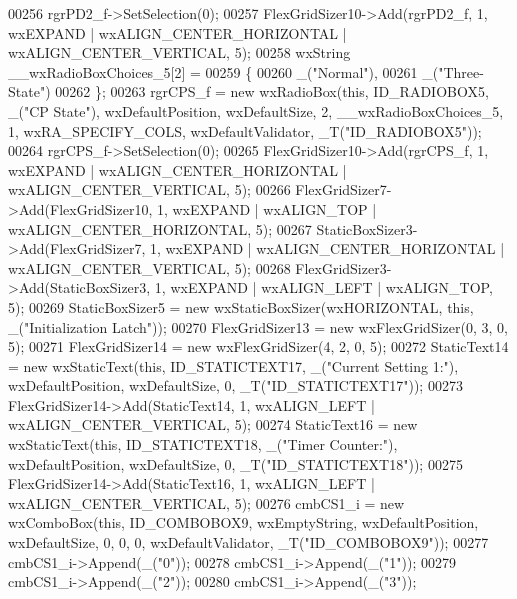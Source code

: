 \begin{DoxyCode}
00256     rgrPD2\_f->SetSelection(0);
00257     FlexGridSizer10->Add(rgrPD2\_f, 1, wxEXPAND | wxALIGN\_CENTER\_HORIZONTAL | wxALIGN\_CENTER\_VERTICAL, 5);
00258     wxString \_\_wxRadioBoxChoices\_5[2] =
00259     \{
00260         \_(\textcolor{stringliteral}{"Normal"}),
00261         \_(\textcolor{stringliteral}{"Three-State"})
00262     \};
00263     rgrCPS\_f = \textcolor{keyword}{new} wxRadioBox(\textcolor{keyword}{this}, ID\_RADIOBOX5, \_(\textcolor{stringliteral}{"CP State"}), wxDefaultPosition, wxDefaultSize, 2, 
      \_\_wxRadioBoxChoices\_5, 1, wxRA\_SPECIFY\_COLS, wxDefaultValidator, _T(\textcolor{stringliteral}{"ID\_RADIOBOX5"}));
00264     rgrCPS\_f->SetSelection(0);
00265     FlexGridSizer10->Add(rgrCPS\_f, 1, wxEXPAND | wxALIGN\_CENTER\_HORIZONTAL | wxALIGN\_CENTER\_VERTICAL, 5);
00266     FlexGridSizer7->Add(FlexGridSizer10, 1, wxEXPAND | wxALIGN\_TOP | wxALIGN\_CENTER\_HORIZONTAL, 5);
00267     StaticBoxSizer3->Add(FlexGridSizer7, 1, wxEXPAND | wxALIGN\_CENTER\_HORIZONTAL | wxALIGN\_CENTER\_VERTICAL,
       5);
00268     FlexGridSizer3->Add(StaticBoxSizer3, 1, wxEXPAND | wxALIGN\_LEFT | wxALIGN\_TOP, 5);
00269     StaticBoxSizer5 = \textcolor{keyword}{new} wxStaticBoxSizer(wxHORIZONTAL, \textcolor{keyword}{this}, \_(\textcolor{stringliteral}{"Initialization Latch"}));
00270     FlexGridSizer13 = \textcolor{keyword}{new} wxFlexGridSizer(0, 3, 0, 5);
00271     FlexGridSizer14 = \textcolor{keyword}{new} wxFlexGridSizer(4, 2, 0, 5);
00272     StaticText14 = \textcolor{keyword}{new} wxStaticText(\textcolor{keyword}{this}, ID\_STATICTEXT17, \_(\textcolor{stringliteral}{"Current Setting 1:"}), wxDefaultPosition, 
      wxDefaultSize, 0, _T(\textcolor{stringliteral}{"ID\_STATICTEXT17"}));
00273     FlexGridSizer14->Add(StaticText14, 1, wxALIGN\_LEFT | wxALIGN\_CENTER\_VERTICAL, 5);
00274     StaticText16 = \textcolor{keyword}{new} wxStaticText(\textcolor{keyword}{this}, ID\_STATICTEXT18, \_(\textcolor{stringliteral}{"Timer Counter:"}), wxDefaultPosition, 
      wxDefaultSize, 0, _T(\textcolor{stringliteral}{"ID\_STATICTEXT18"}));
00275     FlexGridSizer14->Add(StaticText16, 1, wxALIGN\_LEFT | wxALIGN\_CENTER\_VERTICAL, 5);
00276     cmbCS1\_i = \textcolor{keyword}{new} wxComboBox(\textcolor{keyword}{this}, ID\_COMBOBOX9, wxEmptyString, wxDefaultPosition, wxDefaultSize, 0, 0, 0,
       wxDefaultValidator, _T(\textcolor{stringliteral}{"ID\_COMBOBOX9"}));
00277     cmbCS1\_i->Append(\_(\textcolor{stringliteral}{"0"}));
00278     cmbCS1\_i->Append(\_(\textcolor{stringliteral}{"1"}));
00279     cmbCS1\_i->Append(\_(\textcolor{stringliteral}{"2"}));
00280     cmbCS1\_i->Append(\_(\textcolor{stringliteral}{"3"}));

\end{DoxyCode}
